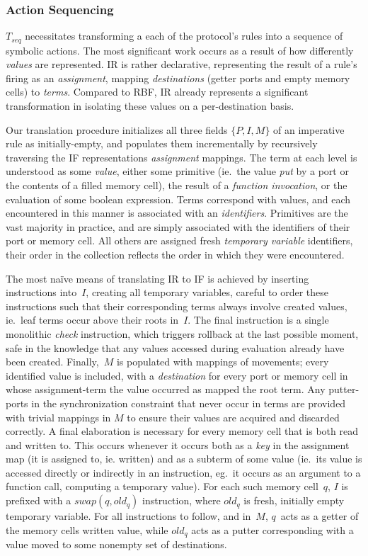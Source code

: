 \subsubsection{Action Sequencing}
$T_{seq}$ necessitates transforming a each of the protocol's rules into a sequence of symbolic actions. The most significant work occurs as a result of how differently \textit{values} are represented. IR is rather declarative, representing the result of a rule's firing as an \textit{assignment}, mapping \textit{destinations} (getter ports and empty memory cells) to \textit{terms}. Compared to RBF, IR already represents a significant transformation in isolating these values on a per-destination basis. 

Our translation procedure initializes all three fields $\{P, I, M\}$ of an imperative rule as initially-empty, and populates them incrementally by recursively traversing the IF representations \textit{assignment} mappings. The term at each level is understood as some \textit{value}, either some primitive (ie.\ the value \textit{put} by a port or the contents of a filled memory cell), the result of a \textit{function invocation}, or the evaluation of some boolean expression. Terms correspond with values, and each encountered in this manner is associated with an \textit{identifiers}. 
Primitives are the vast majority in practice, and are simply associated with the identifiers of their port or memory cell. All others are assigned fresh \textit{temporary variable} identifiers, their order in the collection reflects the order in which they were encountered. 

The most na\"ive means of translating IR to IF is achieved by inserting instructions into~$I$, creating all temporary variables, careful to order these instructions such that their corresponding terms always involve created values, ie.\ leaf terms occur above their roots in~$I$. The final instruction is a single monolithic \textit{check} instruction, which triggers rollback at the last possible moment, safe in the knowledge that any values accessed during evaluation already have been created. Finally,~$M$ is populated with mappings of movements; every identified value is included, with a \textit{destination} for every port or memory cell in whose assignment-term the value occurred as mapped the root term. Any putter-ports in the synchronization constraint that never occur in terms are provided with trivial mappings in $M$ to ensure their values are acquired and discarded correctly.
A final elaboration is necessary for every memory cell that is both read and written to. This occurs whenever it occurs both as a \textit{key} in the assignment map (it is assigned to, ie. written) and as a subterm of some value (ie.\ its value is accessed directly or indirectly in an instruction, eg.\ it occurs as an argument to a function call, computing a temporary value). For each such memory cell~$q$, $I$ is prefixed with a $swap(q, old_q)$ instruction, where $old_q$ is fresh, initially empty temporary variable. For all instructions to follow, and in~$M$, $q$~acts as a getter of the memory cells written value, while $old_q$ acts as a putter corresponding with a value moved to some nonempty set of destinations.

